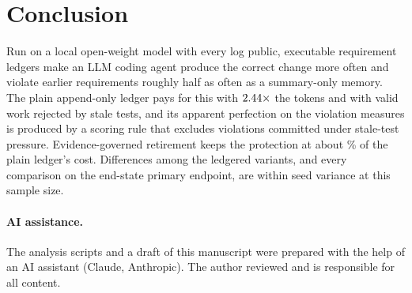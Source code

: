 \documentclass[11pt]{article}
\begin{document}
\section{Conclusion}

Run on a local open-weight model with every log public, executable requirement
ledgers make an LLM coding agent produce the correct change more often and
violate earlier requirements roughly half as often as a summary-only memory.
The plain append-only ledger pays for this with $2.44\times$ the tokens
and with valid work rejected by stale tests, and its apparent perfection on the
violation measures is produced by a scoring rule that excludes violations
committed under stale-test pressure. Evidence-governed retirement keeps the
protection at about \NTokPctOfBC\% of the plain ledger's cost. Differences
among the ledgered variants, and every comparison on the end-state primary
endpoint, are within seed variance at this sample size.

\paragraph{AI assistance.} The analysis scripts and a draft of this manuscript
were prepared with the help of an AI assistant (Claude, Anthropic). The author
reviewed and is responsible for all content.
\end{document}
